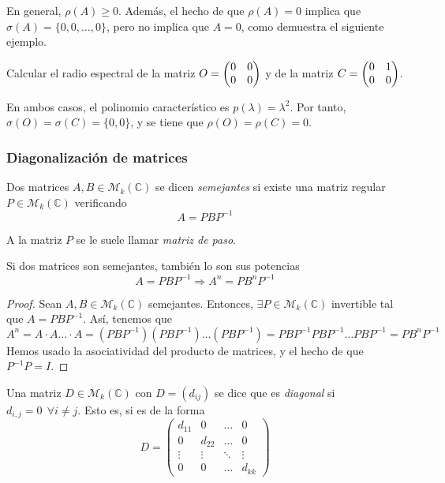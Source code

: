 \begin{nota}
  En general, $\rho(A) \ge 0$. Además, el hecho de que $\rho(A) = 0$  implica que $\sigma(A) = \{0, 0, \hdots ,0\}$, pero no implica que $A=0$, como demuestra el siguiente ejemplo.

\end{nota}

\begin{ejemplo} Calcular el radio espectral de la matriz $O = \begin{pmatrix} 0 & 0 \\ 0 & 0\end{pmatrix}$ y de la matriz $C = \begin{pmatrix} 0 & 1 \\ 0 & 0\end{pmatrix}$.

En ambos casos, el polinomio característico es $p(\lambda) = \lambda^2$. Por tanto, $\sigma(O) = \sigma(C) = \{0,0\}$, y se tiene que $\rho(O) = \rho(C) = 0$.

\end{ejemplo}

\subsubsection{Diagonalización de matrices}

\begin{ndef}
  Dos matrices $A, B \in \mathcal M_k(\mathbb C)$ se dicen \textit{semejantes} si
  existe una matriz regular $P \in \mathcal M_k(\mathbb C)$ verificando $$A
  = PBP^{-1}$$

A la matriz $P$ se le suele llamar \textit{matriz de paso}.
\end{ndef}

\begin{nprop} \label{potencias_semejantes}
  Si dos matrices son semejantes, también lo son sus potencias $$A = PBP^{-1}
  \Rightarrow A^n = PB^nP^{-1}$$
\end{nprop}

\begin{proof}
  Sean $A, B \in \mathcal M_k(\mathbb C)$ semejantes. Entonces, $\exists {P} \in
  \mathcal M_k(\mathbb C)$ invertible tal que $A = PBP^{-1}$. Así, tenemos que
$$A^n = A \cdot A \hdots \cdot A = (PBP^{-1})(PBP^{-1}) \hdots (PBP^{-1}) =
PBP^{-1}PBP^{-1}\hdots PBP^{-1} = PB^nP^{-1}$$ Hemos usado la asociatividad del producto de matrices, y el hecho de que $P^{-1}P = I$.
\end{proof}

\begin{ndef}
  Una matriz $D \in \mathcal M_k(\mathbb C)$ con $D = (d_{ij})$ se dice que es
  \textit{diagonal} si $d_{i,j} = 0\ \ \forall i \neq j$. Esto es, si es de la
  forma
$$ D =
\begin{pmatrix}
  d_{11} & 0 & \hdots & 0 \\
  0 & d_{22} & \hdots & 0 \\
  \vdots & \vdots & \ddots & \vdots \\
  0 & 0 & \hdots & d_{kk}
\end{pmatrix}$$

\end{ndef}

